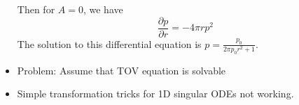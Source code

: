 \begin{frame}
	\begin{itemize}[<+->]
		\begin{proofcont}
			Then for $A=0$, we have
			\begin{equation}
				\frac{\partial p}{\partial r} = -4\pi rp^2
			\end{equation}
			The solution to this differential equation is $p=\frac{p_0}{2\pi p_0r^2+1}$.
		\end{proofcont}
		\item Problem: Assume that TOV equation is solvable
		\item Simple transformation tricks for 1D singular ODEs not working.
	\end{itemize}
\end{frame}


